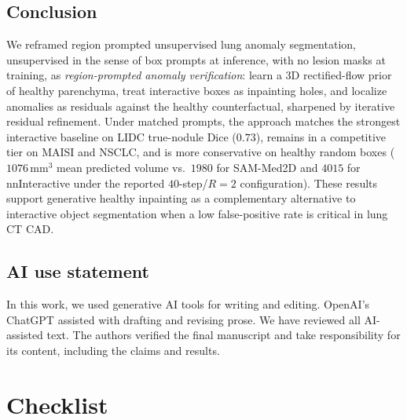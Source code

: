 \documentclass[twoside]{article}
\begin{document}
\subsection{Conclusion}
We reframed region prompted unsupervised lung anomaly segmentation, unsupervised in the
sense of box prompts at inference, with no lesion masks at training, as
\emph{region-prompted anomaly verification}: learn a 3D rectified-flow
prior of healthy parenchyma, treat interactive boxes as inpainting holes,
and localize anomalies as residuals against the healthy counterfactual,
sharpened by iterative residual refinement. Under matched prompts, the
approach matches the strongest interactive baseline on LIDC true-nodule
Dice (\(0.73\)), remains in a competitive tier on MAISI and NSCLC, and is
more conservative on healthy random boxes (\(1076\,\mathrm{mm}^3\) mean
predicted volume vs.\ \(1980\) for SAM-Med2D and \(4015\) for
nnInteractive under the reported \(40\)-step/\(R{=}2\) configuration).
These results support generative healthy inpainting as a complementary
alternative to interactive object segmentation when a low false-positive
rate is critical in lung CT CAD.

\subsection*{AI use statement}

In this work, we used generative AI tools for writing and editing. OpenAI's ChatGPT assisted with drafting and revising prose. We have reviewed all AI-assisted text. The authors verified the final manuscript and take responsibility for its content, including the claims and results.

\acknowledgments{}



\section*{Checklist}
\end{document}
